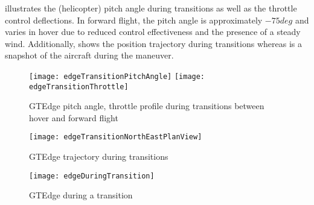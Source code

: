  illustrates the (helicopter) pitch angle
during transitions as well as the throttle control deflections. In
forward flight, the pitch angle is approximately $-75 deg$ and
varies in hover due to reduced control effectiveness and the
presence of a steady wind. Additionally, 
shows the position trajectory during transitions whereas
 is a snapshot of the aircraft during
the maneuver.

\begin{figure}
  \begin{center}
  \texttt{[image: edgeTransitionPitchAngle]}
  \texttt{[image: edgeTransitionThrottle]}
  \caption{GTEdge pitch angle, throttle profile during transitions between hover and forward flight}
  \label{f:gtedgePitchThrottle}
  \end{center}
\end{figure}

\begin{figure}
  \begin{center}
  \texttt{[image: edgeTransitionNorthEastPlanView]}
  \caption{GTEdge trajectory during transitions}
  \label{f:gtedgeTrajectory}
  \end{center}
\end{figure}

\begin{figure}
  \begin{center}
  \texttt{[image: edgeDuringTransition]}
  \caption{GTEdge during a transition}
  \label{f:gtedgeDuringTransition}
  \end{center}
\end{figure}

